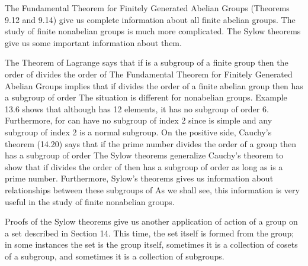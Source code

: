 \documentclass[11pt,oneside]{article}
\begin{document}
\fi
\renewcommand{\BookFooter}{Section 17 Sylow Theorems}
\ifdefined\BookMaster\else\setcounter{page}{149}\fi
\BookNarrativetrue

\begin{BookBody}


\noindent The Fundamental Theorem for Finitely Generated Abelian Groups (Theorems 9.12 and 9.14) give us complete information about all finite abelian groups. The study of finite nonabelian groups is much more complicated. The Sylow theorems give us some important information about them.

The Theorem of Lagrange says that if  is a subgroup of a finite group  then the order of  divides the order of  The Fundamental Theorem for Finitely Generated Abelian Groups implies that if  divides the order of a finite abelian group  then  has a subgroup of order  The situation is different for nonabelian groups. Example 13.6 shows that although  has 12 elements, it has no subgroup of order 6. Furthermore, for  can have no subgroup of index 2 since  is simple and any subgroup of index 2 is a normal subgroup. On the positive side, Cauchy’s theorem (14.20) says that if the prime number  divides the order of a group  then  has a subgroup of order  The Sylow theorems generalize Cauchy’s theorem to show that if  divides the order of  then  has a subgroup of order  as long as  is a prime number. Furthermore, Sylow’s theorems gives us information about relationships between these subgroups of  As we shall see, this information is very useful in the study of finite nonabelian groups.

Proofs of the Sylow theorems give us another application of action of a group on a set described in Section 14. This time, the set itself is formed from the group; in some instances the set is the group itself, sometimes it is a collection of cosets of a subgroup, and sometimes it is a collection of subgroups.

\end{BookBody}
\end{document}
